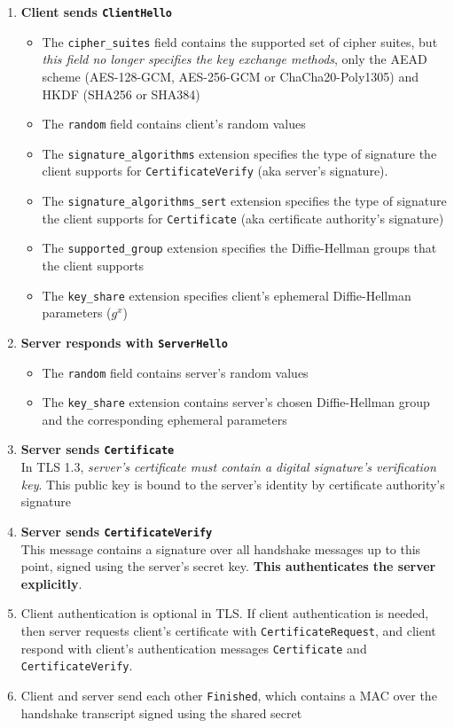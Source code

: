 \documentclass{article}
\begin{document}
\begin{enumerate}
    \item \textbf{Client sends \texttt{ClientHello}} \begin{itemize}
        \item The \texttt{cipher\_suites} field contains the supported set of cipher suites, but \textit{this field no longer specifies the key exchange methods}, only the AEAD scheme (AES-128-GCM, AES-256-GCM or ChaCha20-Poly1305) and HKDF (SHA256 or SHA384)
        \item The \texttt{random} field contains client's random values
        \item The \texttt{signature\_algorithms} extension specifies the type of signature the client supports for \texttt{CertificateVerify} (aka server's signature).
        \item The \texttt{signature\_algorithms\_sert} extension specifies the type of signature the client supports for \texttt{Certificate} (aka certificate authority's signature)
        \item The \texttt{supported\_group} extension specifies the Diffie-Hellman groups that the client supports
        \item The \texttt{key\_share} extension specifies client's ephemeral Diffie-Hellman parameters ($g^x$)
    \end{itemize}

    \item \textbf{Server responds with \texttt{ServerHello}} \begin{itemize}
        \item The \texttt{random} field contains server's random values
        \item The \texttt{key\_share} extension contains server's chosen Diffie-Hellman group and the corresponding ephemeral parameters
    \end{itemize}
    
    \item \textbf{Server sends \texttt{Certificate}} \\ In TLS 1.3, \textit{server's certificate must contain a digital signature's verification key}. This public key is bound to the server's identity by certificate authority's signature
    
    \item \textbf{Server sends \texttt{CertificateVerify}} \\ This message contains a signature over all handshake messages up to this point, signed using the server's secret key. \textbf{This authenticates the server explicitly}.
    
    \item Client authentication is optional in TLS. If client authentication is needed, then server requests client's certificate with \texttt{CertificateRequest}, and client respond with client's authentication messages \texttt{Certificate} and \texttt{CertificateVerify}.
    \item Client and server send each other \texttt{Finished}, which contains a MAC over the handshake transcript signed using the shared secret
\end{enumerate}
\end{document}
